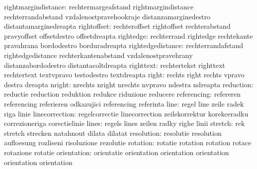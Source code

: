       rightmargindistance: rechtermargeafstand       rightmargindistance
                           rechterrandabstand        vzdalenostpravehookraje
                           distanzamarginedestro     distantamarginedreapta
              rightoffset: rechteroffset             rightoffset
                           rechterabstand            pravyoffset
                           offsetdestro              offsetdreapta
                rightedge: rechterrand               rightedge
                           rechtekante               pravahrana
                           bordodestro               borduradreapta
        rightedgedistance: rechterrandafstand        rightedgedistance
                           rechterkantenabstand      vzdalenostpravehrany
                           distanzabordodestro       distantacoltdreapta
                righttext: rechtertekst              righttext
                           rechtertext               textvpravo
                           testodestro               textdreapta %
                    right: rechts                    right
                           rechts                    vpravo
                           destra                    dreapta
                   nright: nrechts                   nright
                           nrechts                   nvpravo
                           ndestra                   ndreapta
                reduction: reductie                  reduction
                           reduktion                 redukce
                           riduzione                 reducere
              referencing: refereren                 referencing
                           referieren                odkazujici
                           referencing               referinta %
                     line: regel                     line
                           zeile                     radek
                           riga                      linie
           linecorrection: regelcorrectie            linecorrection
                           zeilekorrektur            korekceradku
                           correzioneriga            corectielinie
                    lines: regels                    lines
                           zeilen                    radky
                           righe                     linii
                  stretch: rek                       stretch
                           strecken                  natahnout
                           dilata                    dilatat %
               resolution: resolutie                 resolution
                           aufloesung                rozliseni
                           risoluzione               rezolutie
                 rotation: rotatie                   rotation
                           rotation                  rotace
                           rotazione                 rotatie
              orientation: orientatie                orientation
                           orientation               orientation
                           orientation               orientation


